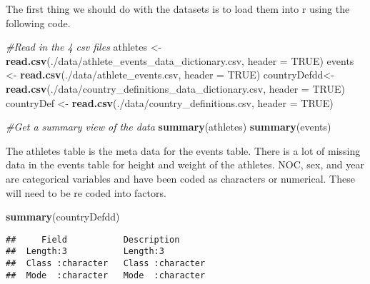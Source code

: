 \documentclass[
]{article}
\newenvironment{Shaded}{\begin{snugshade}}{\end{snugshade}}
\newcommand{\AttributeTok}[1]{\textcolor[rgb]{0.13,0.29,0.53}{#1}}
\newcommand{\CommentTok}[1]{\textcolor[rgb]{0.56,0.35,0.01}{\textit{#1}}}
\newcommand{\ConstantTok}[1]{\textcolor[rgb]{0.56,0.35,0.01}{#1}}
\newcommand{\FunctionTok}[1]{\textcolor[rgb]{0.13,0.29,0.53}{\textbf{#1}}}
\newcommand{\NormalTok}[1]{#1}
\newcommand{\OtherTok}[1]{\textcolor[rgb]{0.56,0.35,0.01}{#1}}
\newcommand{\StringTok}[1]{\textcolor[rgb]{0.31,0.60,0.02}{#1}}
\begin{document}
The first thing we should do with the datasets is to load them into r using the following code.

\begin{Shaded}
\begin{Highlighting}[]
\CommentTok{\#Read in the 4 csv files}
\NormalTok{athletes }\OtherTok{\textless{}{-}} \FunctionTok{read.csv}\NormalTok{(}\StringTok{\textquotesingle{}./data/athlete\_events\_data\_dictionary.csv\textquotesingle{}}\NormalTok{, }
                     \AttributeTok{header =} \ConstantTok{TRUE}\NormalTok{)}
\NormalTok{events }\OtherTok{\textless{}{-}} \FunctionTok{read.csv}\NormalTok{(}\StringTok{\textquotesingle{}./data/athlete\_events.csv\textquotesingle{}}\NormalTok{, }
                   \AttributeTok{header =} \ConstantTok{TRUE}\NormalTok{)}
\NormalTok{countryDefdd}\OtherTok{\textless{}{-}} \FunctionTok{read.csv}\NormalTok{(}\StringTok{\textquotesingle{}./data/country\_definitions\_data\_dictionary.csv\textquotesingle{}}\NormalTok{,}
                        \AttributeTok{header =} \ConstantTok{TRUE}\NormalTok{)}
\NormalTok{countryDef }\OtherTok{\textless{}{-}} \FunctionTok{read.csv}\NormalTok{(}\StringTok{\textquotesingle{}./data/country\_definitions.csv\textquotesingle{}}\NormalTok{,}
                       \AttributeTok{header =} \ConstantTok{TRUE}\NormalTok{)}

\CommentTok{\#Get a summary view of the data}
\FunctionTok{summary}\NormalTok{(athletes)}
\FunctionTok{summary}\NormalTok{(events)}
\end{Highlighting}
\end{Shaded}

The athletes table is the meta data for the events table. There is a lot of missing data in the events table for height and weight of the athletes. NOC, sex, and year are categorical variables and have been coded as characters or numerical. These will need to be re coded into factors.

\begin{Shaded}
\begin{Highlighting}[]
\FunctionTok{summary}\NormalTok{(countryDefdd)}
\end{Highlighting}
\end{Shaded}

\begin{verbatim}
##     Field           Description       
##  Length:3           Length:3          
##  Class :character   Class :character  
##  Mode  :character   Mode  :character
\end{verbatim}
\end{document}
